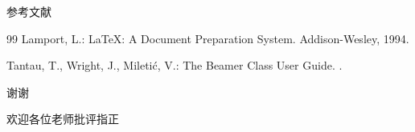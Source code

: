 \documentclass[12pt,aspectratio=43]{beamer}
\begin{document}
\begin{frame}{参考文献}
  \begin{thebibliography}{99}
    Lamport, L.:
    \newblock \LaTeX: A Document Preparation System.
    \newblock Addison-Wesley, 1994.

    Tantau, T., Wright, J., Miletić, V.:
    \newblock The Beamer Class User Guide.
    .
  \end{thebibliography}
\end{frame}

\begin{frame}
  \centering
  \vspace{1.85cm}
  {\color{JLUBlue}\JLUKai\Huge 谢\quad 谢}

  \vspace{.45cm}
  {\JLUKai\Large 欢迎各位老师批评指正}
\end{frame}
\end{document}
